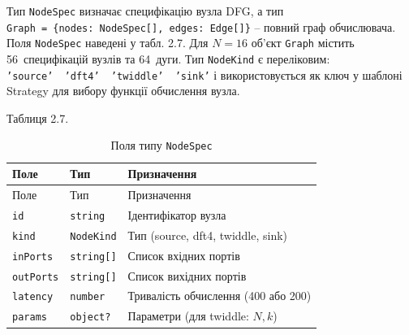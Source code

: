 \documentclass[
]{article}
\begin{document}
Тип \texttt{NodeSpec} визначає специфікацію вузла DFG, а тип
\texttt{Graph}\texttt{\ =\ \{}\texttt{nodes}\texttt{:\ }\texttt{NodeSpec}\texttt{{[}{]},\ }\texttt{edges}\texttt{:\ }\texttt{Edge}\texttt{{[}{]}\}}
-- повний граф обчислювача. Поля \texttt{NodeSpec} наведені у табл. 2.7.
Для \(N = 16\) об'єкт \texttt{Graph} містить 56~специфікацій вузлів та
64~дуги. Тип \texttt{NodeKind} є переліковим:
\texttt{’}\texttt{source}\texttt{’\ \textbar{}\ ’dft4’\ \textbar{}\ ’}\texttt{twiddle}\texttt{’\ \textbar{}\ ’}\texttt{sink}\texttt{’}
і використовується як ключ у шаблоні Strategy для вибору функції
обчислення вузла.

Таблиця 2.7.

\begin{longtable}[]{@{}
  >{\raggedright\arraybackslash}p{}
  >{\raggedright\arraybackslash}p{}
  >{\raggedright\arraybackslash}p{}@{}}
\caption{Поля типу \protect\texttt{NodeSpec}}\tabularnewline
\toprule\noalign{}
\begin{minipage}[b]{\linewidth}\raggedright
Поле
\end{minipage} & \begin{minipage}[b]{\linewidth}\raggedright
Тип
\end{minipage} & \begin{minipage}[b]{\linewidth}\raggedright
Призначення
\end{minipage} \\
\midrule\noalign{}
\endfirsthead
\toprule\noalign{}
\begin{minipage}[b]{\linewidth}\raggedright
Поле
\end{minipage} & \begin{minipage}[b]{\linewidth}\raggedright
Тип
\end{minipage} & \begin{minipage}[b]{\linewidth}\raggedright
Призначення
\end{minipage} \\
\midrule\noalign{}
\endhead
\bottomrule\noalign{}
\endlastfoot
\texttt{id} & \texttt{string} & Ідентифікатор вузла \\
\texttt{kind} & \texttt{NodeKind} & Тип (source, dft4, twiddle, sink) \\
\texttt{inPorts} & \texttt{string}\texttt{{[}{]}} & Список вхідних
портів \\
\texttt{outPorts} & \texttt{string}\texttt{{[}{]}} & Список вихідних
портів \\
\texttt{latency} & \texttt{number} & Тривалість обчислення (400 або
200) \\
\texttt{params} & \texttt{object}\texttt{?} & Параметри (для twiddle:
\(N,k\)) \\
\end{longtable}
\end{document}
